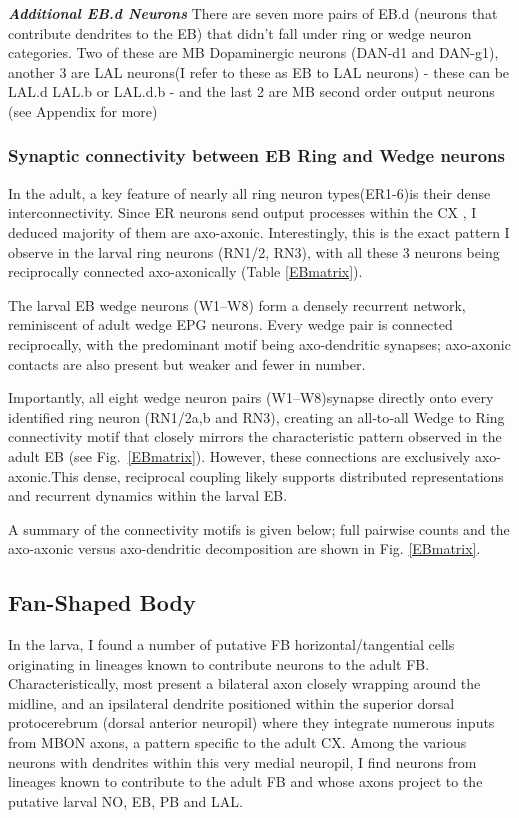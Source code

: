             \textbf{\textit{Additional EB.d Neurons}}
            There are seven more pairs of EB.d (neurons that contribute dendrites to the EB) that didn't fall under ring or wedge neuron categories. Two of these are MB Dopaminergic neurons (DAN-d1 and DAN-g1), another 3 are LAL neurons(I refer to these as EB to LAL neurons) - these can be LAL.d LAL.b or LAL.d.b - and the last 2 are MB second order output neurons (see Appendix for more)%


        \subsubsection{Synaptic connectivity between EB Ring and Wedge neurons}
            In the adult, a key feature of nearly all ring neuron types(ER1-6)is their dense interconnectivity. Since ER neurons send output processes within the CX \citep{hulse2021connectome}, I deduced majority of them are axo-axonic. Interestingly, this is the exact pattern I observe in the larval ring neurons (RN1/2, RN3), with all these 3 neurons being reciprocally connected axo-axonically (Table \ref{EBmatrix}). 

            The larval EB wedge neurons (W1–W8) form a densely recurrent network, reminiscent of adult wedge EPG neurons. Every wedge pair is connected reciprocally, with the predominant motif being axo-dendritic synapses; axo-axonic contacts are also present but weaker and fewer in number. 

            Importantly, all eight wedge neuron pairs (W1–W8)synapse directly onto every identified ring neuron (RN1/2a,b and RN3), creating an all‑to‑all Wedge to Ring connectivity motif that closely mirrors the characteristic pattern observed in the adult EB (see Fig.~\ref{EBmatrix}). However, these connections are exclusively axo-axonic.This dense, reciprocal coupling likely supports distributed representations and recurrent dynamics within the larval EB. 

            A summary of the connectivity motifs is given below; full pairwise counts and the axo-axonic versus axo-dendritic decomposition are shown in Fig. \ref{EBmatrix}. 

    \subsection{Fan-Shaped Body}
        In the larva, I found a number of putative FB horizontal/tangential cells originating in lineages known to contribute neurons to the adult FB. Characteristically, most present a bilateral axon closely wrapping around the midline, and an ipsilateral dendrite positioned within the superior dorsal protocerebrum (dorsal anterior neuropil) where they integrate numerous inputs from MBON axons, a pattern specific to the adult CX. Among the various neurons with dendrites within this very medial neuropil, I find neurons from lineages known to contribute to the adult FB and whose axons project to the putative larval NO, EB, PB and LAL.

